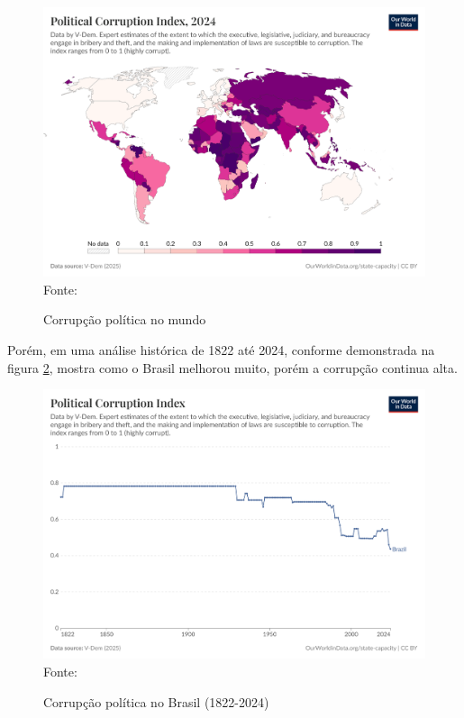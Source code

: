 \begin{figure}[H]
	\centering
	\caption{Corrupção política no mundo}
	\includegraphics[width=1\linewidth]{figuras/political-corruption-index}
	\label{fig:political-corruption-index}
	\footnotesize{Fonte: \cite{political-corruption-index}}
\end{figure} 

Porém, em uma análise histórica de 1822 até 2024, conforme demonstrada na figura \ref{fig:political-corruption-index-brasil}, mostra como o Brasil melhorou muito, porém a corrupção continua alta.

\begin{figure}[H]
	\centering
	\caption{Corrupção política no Brasil (1822-2024)}
	\includegraphics[width=1\linewidth]{figuras/political-corruption-index-brasil}
	\label{fig:political-corruption-index-brasil}
	\footnotesize{Fonte: \cite{political-corruption-index}}
\end{figure} 


